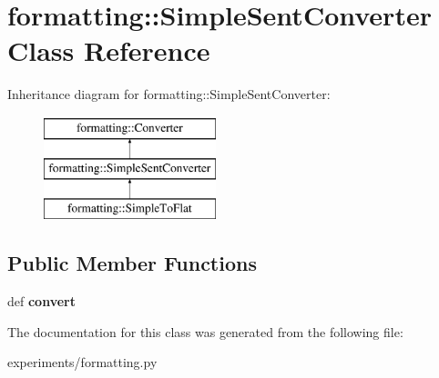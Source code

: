 \hypertarget{classformatting_1_1SimpleSentConverter}{
\section{formatting::SimpleSentConverter Class Reference}
\label{classformatting_1_1SimpleSentConverter}
}
Inheritance diagram for formatting::SimpleSentConverter:\begin{figure}[H]
\begin{center}
\leavevmode
\includegraphics[height=3cm]{classformatting_1_1SimpleSentConverter}
\end{center}
\end{figure}
\subsection*{Public Member Functions}
\begin{DoxyCompactItemize}
\item 
\hypertarget{classformatting_1_1SimpleSentConverter_a2d86c1c5254342f61e8d6b1bd8230e54}{
def {\bfseries convert}}
\label{classformatting_1_1SimpleSentConverter_a2d86c1c5254342f61e8d6b1bd8230e54}

\end{DoxyCompactItemize}


The documentation for this class was generated from the following file:\begin{DoxyCompactItemize}
\item 
experiments/formatting.py\end{DoxyCompactItemize}
